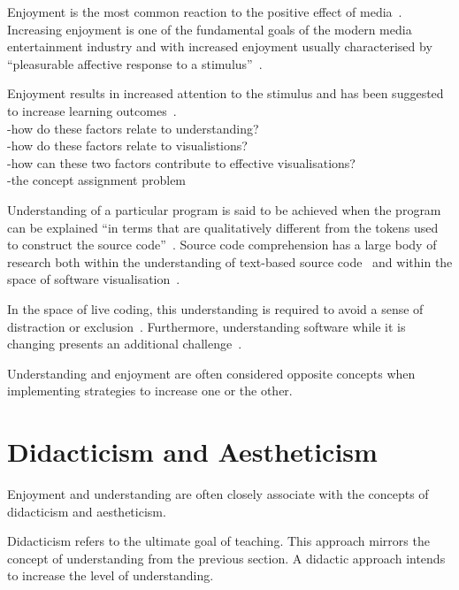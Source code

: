 Enjoyment is the most common reaction to the positive effect of media~\cite{Vorderer2004}. Increasing enjoyment is one of the fundamental goals of the modern media entertainment industry and with increased enjoyment usually characterised by ``pleasurable affective response to a stimulus''~\cite{Brock2004}. 

Enjoyment results in increased attention to the stimulus and has been suggested to increase learning outcomes~.\\
-how do these factors relate to understanding?\\
-how do these factors relate to visualistions?\\
-how can these two factors contribute to effective visualisations?\\
-the concept assignment problem~\cite{Biggerstaff1994}

Understanding of a particular program is said to be achieved when the program can be explained ``in terms that are qualitatively different from the tokens used to construct the source code''~\cite{Biggerstaff1994}. Source code comprehension has a large body of research both within the understanding of text-based source code~ and within the space of software visualisation~\cite{Hosking2005}.

In the space of live coding, this understanding is required to avoid a sense of distraction or exclusion~\cite{McLean2010a}. Furthermore, understanding software while it is changing presents an additional challenge~\cite{Eisenbarth2003}.

Understanding and enjoyment are often considered opposite concepts when implementing strategies to increase one or the other. 

\section{Didacticism and Aestheticism}

Enjoyment and understanding are often closely associate with the concepts of didacticism and aestheticism.

Didacticism refers to the ultimate goal of teaching. This approach mirrors the concept of understanding from the previous section. A didactic approach intends to increase the level of understanding.


